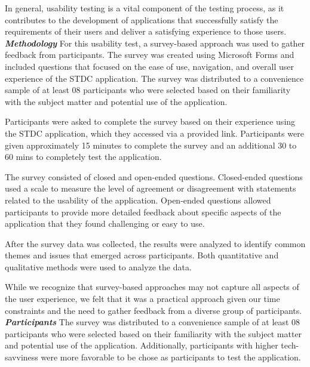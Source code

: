 \begin{justify}
\vspace{0.25cm}
\newendline In general, usability testing is a vital component of the testing process, as it contributes to the development of applications that successfully satisfy the requirements of their users and deliver a satisfying experience to those users.\\


\newendline \textbf{\textit{Methodology}}\newendline
For this usability test, a survey-based approach was used to gather feedback from participants. The survey was created using Microsoft Forms and included questions that focused on the ease of use, navigation, and overall user experience of the STDC application. The survey was distributed to a convenience sample of at least 08 participants who were selected based on their familiarity with the subject matter and potential use of the application.

\vspace{0.25cm}
\newendline Participants were asked to complete the survey based on their experience using the STDC application, which they accessed via a provided link. Participants were given approximately 15 minutes to complete the survey and an additional 30 to 60 mins to completely test the application.

\vspace{0.25cm}
\newendline The survey consisted of closed and open-ended questions. Closed-ended questions used a scale to measure the level of agreement or disagreement with statements related to the usability of the application. Open-ended questions allowed participants to provide more detailed feedback about specific aspects of the application that they found challenging or easy to use.

\vspace{0.25cm}
\newendline After the survey data was collected, the results were analyzed to identify common themes and issues that emerged across participants. Both quantitative and qualitative methods were used to analyze the data.

\vspace{0.25cm}
\newendline While we recognize that survey-based approaches may not capture all aspects of the user experience, we felt that it was a practical approach given our time constraints and the need to gather feedback from a diverse group of participants.\\


\newendline \textbf{\textit{Participants}}\newendline
The survey was distributed to a convenience sample of at least 08 participants who were selected based on their familiarity with the subject matter and potential use of the application. Additionally, participants with higher tech-savviness were more favorable to be chose as participants to test the application.


\end{justify}
